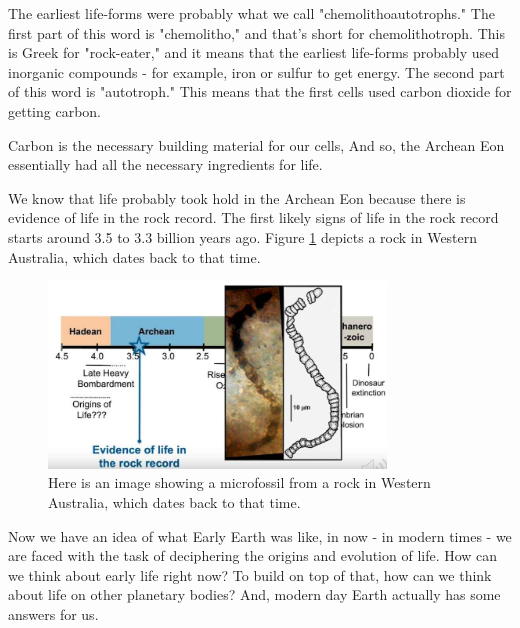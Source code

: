 \documentclass[]{article}
\begin{document}
The earliest life-forms were probably
what we call "chemolithoautotrophs."
The first part of this word
is "chemolitho,"
and that's short for chemolithotroph.
This is Greek for "rock-eater,"
and it means
that the earliest life-forms
probably used inorganic compounds -
for example, iron or sulfur
to get energy.
The second part of this word
is "autotroph."
This means that the first cells
used carbon dioxide for getting carbon.

Carbon is the necessary building material
for our cells,
And so, the Archean Eon essentially had
all the necessary ingredients for life.

We know that life probably took hold
in the Archean Eon
because there is evidence of life
in the rock record.
The first likely signs of life
in the rock record
starts around 3.5
to 3.3 billion years ago.
Figure \ref{fig:EvidenceOfLife} depicts a rock in Western Australia,
which dates back to that time.

\begin{figure}[H]
	\caption[Archaean microfossil
	from a rock in Western Australia]{Here is an image showing a microfossil
		from a rock in Western Australia, which dates back to that time.}\label{fig:EvidenceOfLife}
	\includegraphics[width=0.8\textwidth]{EvidenceOfLife}
\end{figure}
Now we have an idea
of what Early Earth was like,
in now - in modern times -
we are faced with the task
of deciphering the origins
and evolution of life.
How can we think about early life
right now?
To build on top of that,
how can we think about life
on other planetary bodies?
And, modern day Earth
actually has some answers for us.
\end{document}
